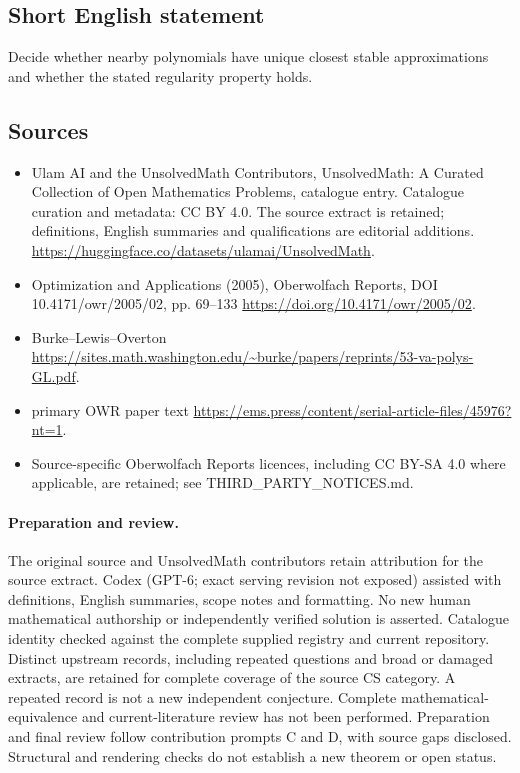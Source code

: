\documentclass[11pt]{article}
\begin{document}
\subsection{Short English statement}
Decide whether nearby polynomials have unique closest stable approximations and whether the stated regularity property holds.
\subsection{Sources}
\begin{itemize}
\item[\hypertarget{source:statement:1}{S1}] Ulam AI and the UnsolvedMath Contributors, UnsolvedMath: A Curated Collection of Open Mathematics Problems, catalogue entry. Catalogue curation and metadata: CC BY 4.0. The source extract is retained; definitions, English summaries and qualifications are editorial additions.
\url{https://huggingface.co/datasets/ulamai/UnsolvedMath}.
\item[\hypertarget{source:statement:2}{S2}] Optimization and Applications (2005), Oberwolfach Reports, DOI 10.4171/owr/2005/02, pp. 69--133
\url{https://doi.org/10.4171/owr/2005/02}.
\item[\hypertarget{source:statement:3}{S3}] Burke--Lewis--Overton
\url{https://sites.math.washington.edu/~burke/papers/reprints/53-va-polys-GL.pdf}.
\item[\hypertarget{source:statement:4}{S4}] primary OWR paper text
\url{https://ems.press/content/serial-article-files/45976?nt=1}.
\item Source-specific Oberwolfach Reports licences, including CC BY-SA 4.0 where applicable, are retained; see THIRD\_PARTY\_NOTICES.md.
\end{itemize}
\paragraph{Preparation and review.}
The original source and UnsolvedMath contributors retain attribution for the source extract. Codex (GPT-6; exact serving revision not exposed) assisted with definitions, English summaries, scope notes and formatting. No new human mathematical authorship or independently verified solution is asserted. Catalogue identity checked against the complete supplied registry and current repository. Distinct upstream records, including repeated questions and broad or damaged extracts, are retained for complete coverage of the source CS category. A repeated record is not a new independent conjecture. Complete mathematical-equivalence and current-literature review has not been performed. Preparation and final review follow contribution prompts C and D, with source gaps disclosed. Structural and rendering checks do not establish a new theorem or open status.
\label{end:statement}
\end{document}
